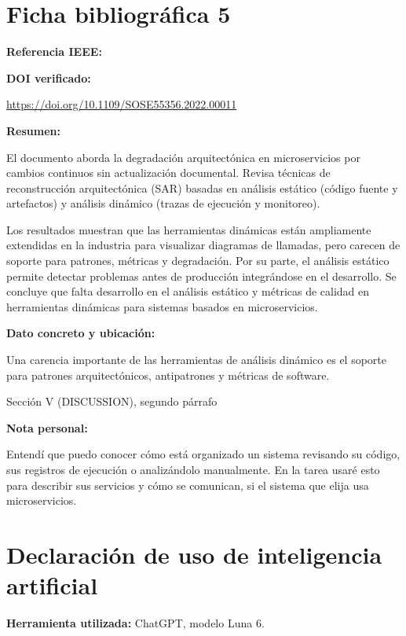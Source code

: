 \documentclass[12pt]{article}
\begin{document}
\clearpage
\section*{Ficha bibliográfica 5}

\textbf{Referencia IEEE:}


\textbf{DOI verificado:}

\url{https://doi.org/10.1109/SOSE55356.2022.00011}

\textbf{Resumen:}

El documento aborda la degradación arquitectónica en microservicios por cambios continuos sin actualización documental. Revisa técnicas de reconstrucción arquitectónica (SAR) basadas en análisis estático (código fuente y artefactos) y análisis dinámico (trazas de ejecución y monitoreo). 

Los resultados muestran que las herramientas dinámicas están ampliamente extendidas en la industria para visualizar diagramas de llamadas, pero carecen de soporte para patrones, métricas y degradación. Por su parte, el análisis estático permite detectar problemas antes de producción integrándose en el desarrollo. Se concluye que falta desarrollo en el análisis estático y métricas de calidad en herramientas dinámicas para sistemas basados en microservicios.

\textbf{Dato concreto y ubicación:}

Una carencia importante de las herramientas de análisis dinámico es el soporte para patrones arquitectónicos, antipatrones y métricas de software.

Sección V (DISCUSSION), segundo párrafo

\textbf{Nota personal:}

Entendí que puedo conocer cómo está organizado un sistema revisando su código, sus registros de ejecución o analizándolo manualmente. En la tarea usaré esto para describir sus servicios y cómo se comunican, si el sistema que elija usa microservicios.



\section*{Declaración de uso de inteligencia artificial}

\textbf{Herramienta utilizada:} ChatGPT, modelo Luna 6.
\end{document}

